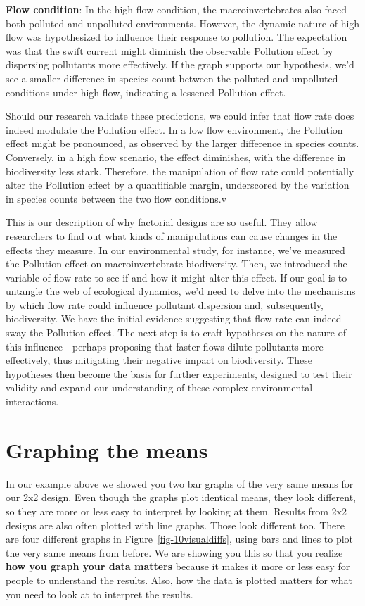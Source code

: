 \documentclass[
  letterpaper,
  DIV=11,
  numbers=noendperiod]{scrreprt}
\begin{document}
\textbf{Flow condition}: In the high flow condition, the
macroinvertebrates also faced both polluted and unpolluted environments.
However, the dynamic nature of high flow was hypothesized to influence
their response to pollution. The expectation was that the swift current
might diminish the observable Pollution effect by dispersing pollutants
more effectively. If the graph supports our hypothesis, we'd see a
smaller difference in species count between the polluted and unpolluted
conditions under high flow, indicating a lessened Pollution effect.

Should our research validate these predictions, we could infer that flow
rate does indeed modulate the Pollution effect. In a low flow
environment, the Pollution effect might be pronounced, as observed by
the larger difference in species counts. Conversely, in a high flow
scenario, the effect diminishes, with the difference in biodiversity
less stark. Therefore, the manipulation of flow rate could potentially
alter the Pollution effect by a quantifiable margin, underscored by the
variation in species counts between the two flow conditions.v

This is our description of why factorial designs are so useful. They
allow researchers to find out what kinds of manipulations can cause
changes in the effects they measure. In our environmental study, for
instance, we've measured the Pollution effect on macroinvertebrate
biodiversity. Then, we introduced the variable of flow rate to see if
and how it might alter this effect. If our goal is to untangle the web
of ecological dynamics, we'd need to delve into the mechanisms by which
flow rate could influence pollutant dispersion and, subsequently,
biodiversity. We have the initial evidence suggesting that flow rate can
indeed sway the Pollution effect. The next step is to craft hypotheses
on the nature of this influence---perhaps proposing that faster flows
dilute pollutants more effectively, thus mitigating their negative
impact on biodiversity. These hypotheses then become the basis for
further experiments, designed to test their validity and expand our
understanding of these complex environmental interactions.

\section{Graphing the means}\label{graphing-the-means}

In our example above we showed you two bar graphs of the very same means
for our 2x2 design. Even though the graphs plot identical means, they
look different, so they are more or less easy to interpret by looking at
them. Results from 2x2 designs are also often plotted with line graphs.
Those look different too. There are four different graphs in
Figure~\ref{fig-10visualdiffs}, using bars and lines to plot the very
same means from before. We are showing you this so that you realize
\textbf{how you graph your data matters} because it makes it more or
less easy for people to understand the results. Also, how the data is
plotted matters for what you need to look at to interpret the results.
\end{document}

